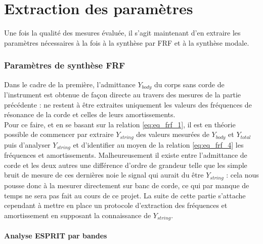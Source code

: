 \chapter{Extraction des paramètres}

Une fois la qualité des mesures évaluée, il s'agit maintenant d'en extraire les paramètres nécessaires à la fois à la synthèse par FRF et à la synthèse modale.

\subsection{Paramètres de synthèse FRF}

Dans le cadre de la première, l'admittance $Y_{body}$ du corps sans corde de l'instrument est obtenue de façon directe au travers des mesures de la partie précédente : ne restent à être extraites uniquement les valeurs des fréquences de résonance de la corde et celles de leurs amortissements.\\

Pour ce faire, et en se basant sur la relation \ref{eq:eq_frf_1}, il est en théorie possible de commencer par extraire $Y_{string}$ des valeurs mesurées de $Y_{body}$ et $Y_{total}$ puis d'analyser $Y_{string}$ et d'identifier au moyen de la relation \ref{eq:eq_frf_4} les fréquences et amortissements. Malheureusement il existe entre l'admittance de corde et les deux autres une différence d'ordre de grandeur telle que les simple bruit de mesure de ces dernières noie le signal qui aurait du être $Y_{string}$ : cela nous pousse donc à la mesurer directement sur banc de corde, ce qui par manque de temps ne sera pas fait au cours de ce projet. La suite de cette partie s'attache cependant à mettre en place un protocole d'extraction des fréquences et amortissement en supposant la connaissance de $Y_{string}$.\\

\subsubsection{Analyse ESPRIT par bandes}
\label{esprit}

